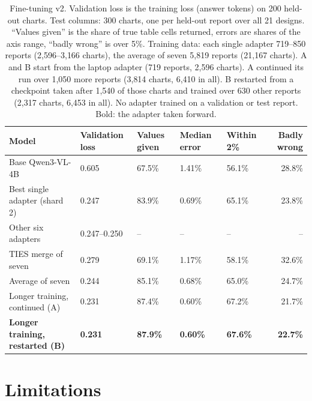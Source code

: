 \documentclass[11pt,a4paper]{article}
\begin{document}
\begin{table}[H]
\centering\small\setlength{\tabcolsep}{5pt}
\begin{tabularx}{\textwidth}{@{}P{0.35}Q{0.13}Q{0.13}Q{0.13}Q{0.13}R@{}}
\toprule
\textbf{Model} & \textbf{Validation loss} & \textbf{Values given} & \textbf{Median error} & \textbf{Within 2\%} & \textbf{Badly wrong}\\
\midrule
Base Qwen3-VL-4B & 0.605 & 67.5\% & 1.41\% & 56.1\% & 28.8\%\\
Best single adapter (shard 2) & 0.247 & 83.9\% & 0.69\% & 65.1\% & 23.8\%\\
Other six adapters & 0.247--0.250 & -- & -- & -- & --\\
TIES merge of seven & 0.279 & 69.1\% & 1.17\% & 58.1\% & 32.6\%\\
Average of seven & 0.244 & 85.1\% & 0.68\% & 65.0\% & 24.7\%\\
Longer training, continued (A) & 0.231 & 87.4\% & 0.60\% & 67.2\% & 21.7\%\\
\textbf{Longer training, restarted (B)} & \textbf{0.231} & \textbf{87.9\%} & \textbf{0.60\%} & \textbf{67.6\%} & \textbf{22.7\%}\\
\bottomrule
\end{tabularx}
\caption{Fine-tuning v2. Validation loss is the training loss (answer tokens) on 200 held-out charts. Test columns: 300 charts, one per held-out report over all 21 designs. ``Values given'' is the share of true table cells returned, errors are shares of the axis range, ``badly wrong'' is over 5\%. Training data: each single adapter 719--850 reports (2{,}596--3{,}166 charts), the average of seven 5{,}819 reports (21{,}167 charts). A and B start from the laptop adapter (719 reports, 2{,}596 charts). A continued its run over 1{,}050 more reports (3{,}814 charts, 6{,}410 in all). B restarted from a checkpoint taken after 1{,}540 of those charts and trained over 630 other reports (2{,}317 charts, 6{,}453 in all). No adapter trained on a validation or test report. Bold: the adapter taken forward.}
\label{tab:ft}
\end{table}

\section{Limitations}\label{sec:limits}
\end{document}
